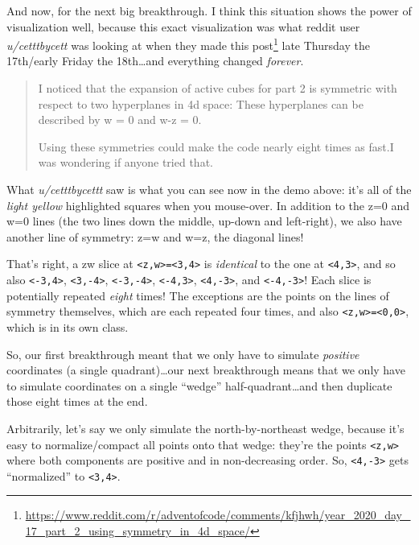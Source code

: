 \documentclass[]{article}
\renewcommand{\href}[2]{#2\footnote{\url{#1}}}
\begin{document}
And now, for the next big breakthrough. I think this situation shows the power
of visualization well, because this exact visualization was what reddit user
\emph{u/cetttbycett} was looking at when
\href{https://www.reddit.com/r/adventofcode/comments/kfjhwh/year_2020_day_17_part_2_using_symmetry_in_4d_space/}{they
made this post} late Thursday the 17th/early Friday the 18th\ldots and
everything changed \emph{forever}.

\begin{quote}
I noticed that the expansion of active cubes for part 2 is symmetric with
respect to two hyperplanes in 4d space: These hyperplanes can be described by w
= 0 and w-z = 0.

Using these symmetries could make the code nearly eight times as fast.I was
wondering if anyone tried that.
\end{quote}

What \emph{u/cetttbycettt} saw is what you can see now in the demo above: it's
all of the \emph{light yellow} highlighted squares when you mouse-over. In
addition to the z=0 and w=0 lines (the two lines down the middle, up-down and
left-right), we also have another line of symmetry: z=w and w=z, the diagonal
lines!

That's right, a zw slice at
\texttt{\textless{}z,w\textgreater{}=\textless{}3,4\textgreater{}} is
\emph{identical} to the one at \texttt{\textless{}4,3\textgreater{}}, and so
also \texttt{\textless{}-3,4\textgreater{}},
\texttt{\textless{}3,-4\textgreater{}}, \texttt{\textless{}-3,-4\textgreater{}},
\texttt{\textless{}-4,3\textgreater{}}, \texttt{\textless{}4,-3\textgreater{}},
and \texttt{\textless{}-4,-3\textgreater{}}! Each slice is potentially repeated
\emph{eight} times! The exceptions are the points on the lines of symmetry
themselves, which are each repeated four times, and also
\texttt{\textless{}z,w\textgreater{}=\textless{}0,0\textgreater{}}, which is in
its own class.

So, our first breakthrough meant that we only have to simulate \emph{positive}
coordinates (a single quadrant)\ldots our next breakthrough means that we only
have to simulate coordinates on a single ``wedge'' half-quadrant\ldots and then
duplicate those eight times at the end.

Arbitrarily, let's say we only simulate the north-by-northeast wedge, because
it's easy to normalize/compact all points onto that wedge: they're the points
\texttt{\textless{}z,w\textgreater{}} where both components are positive and in
non-decreasing order. So, \texttt{\textless{}4,-3\textgreater{}} gets
``normalized'' to \texttt{\textless{}3,4\textgreater{}}.
\end{document}
